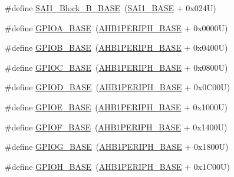 \begin{DoxyCompactItemize}
\item 
\#define \hyperlink{group___peripheral__memory__map_gacdb59b321830def8c7a57c154178bc48}{S\+A\+I1\+\_\+\+Block\+\_\+\+B\+\_\+\+B\+A\+SE}~(\hyperlink{group___peripheral__memory__map_ga24c1053b754946b512f9c31123e09d21}{S\+A\+I1\+\_\+\+B\+A\+SE} + 0x024\+U)
\item 
\#define \hyperlink{group___peripheral__memory__map_gad7723846cc5db8e43a44d78cf21f6efa}{G\+P\+I\+O\+A\+\_\+\+B\+A\+SE}~(\hyperlink{group___peripheral__memory__map_ga811a9a4ca17f0a50354a9169541d56c4}{A\+H\+B1\+P\+E\+R\+I\+P\+H\+\_\+\+B\+A\+SE} + 0x0000\+U)
\item 
\#define \hyperlink{group___peripheral__memory__map_gac944a89eb789000ece920c0f89cb6a68}{G\+P\+I\+O\+B\+\_\+\+B\+A\+SE}~(\hyperlink{group___peripheral__memory__map_ga811a9a4ca17f0a50354a9169541d56c4}{A\+H\+B1\+P\+E\+R\+I\+P\+H\+\_\+\+B\+A\+SE} + 0x0400\+U)
\item 
\#define \hyperlink{group___peripheral__memory__map_ga26f267dc35338eef219544c51f1e6b3f}{G\+P\+I\+O\+C\+\_\+\+B\+A\+SE}~(\hyperlink{group___peripheral__memory__map_ga811a9a4ca17f0a50354a9169541d56c4}{A\+H\+B1\+P\+E\+R\+I\+P\+H\+\_\+\+B\+A\+SE} + 0x0800\+U)
\item 
\#define \hyperlink{group___peripheral__memory__map_ga1a93ab27129f04064089616910c296ec}{G\+P\+I\+O\+D\+\_\+\+B\+A\+SE}~(\hyperlink{group___peripheral__memory__map_ga811a9a4ca17f0a50354a9169541d56c4}{A\+H\+B1\+P\+E\+R\+I\+P\+H\+\_\+\+B\+A\+SE} + 0x0\+C00\+U)
\item 
\#define \hyperlink{group___peripheral__memory__map_gab487b1983d936c4fee3e9e88b95aad9d}{G\+P\+I\+O\+E\+\_\+\+B\+A\+SE}~(\hyperlink{group___peripheral__memory__map_ga811a9a4ca17f0a50354a9169541d56c4}{A\+H\+B1\+P\+E\+R\+I\+P\+H\+\_\+\+B\+A\+SE} + 0x1000\+U)
\item 
\#define \hyperlink{group___peripheral__memory__map_ga7f9a3f4223a1a784af464a114978d26e}{G\+P\+I\+O\+F\+\_\+\+B\+A\+SE}~(\hyperlink{group___peripheral__memory__map_ga811a9a4ca17f0a50354a9169541d56c4}{A\+H\+B1\+P\+E\+R\+I\+P\+H\+\_\+\+B\+A\+SE} + 0x1400\+U)
\item 
\#define \hyperlink{group___peripheral__memory__map_ga5d8ca4020f2e8c00bde974e8e7c13cfe}{G\+P\+I\+O\+G\+\_\+\+B\+A\+SE}~(\hyperlink{group___peripheral__memory__map_ga811a9a4ca17f0a50354a9169541d56c4}{A\+H\+B1\+P\+E\+R\+I\+P\+H\+\_\+\+B\+A\+SE} + 0x1800\+U)
\item 
\#define \hyperlink{group___peripheral__memory__map_gaee4716389f3a1c727495375b76645608}{G\+P\+I\+O\+H\+\_\+\+B\+A\+SE}~(\hyperlink{group___peripheral__memory__map_ga811a9a4ca17f0a50354a9169541d56c4}{A\+H\+B1\+P\+E\+R\+I\+P\+H\+\_\+\+B\+A\+SE} + 0x1\+C00\+U)

\end{DoxyCompactItemize}
